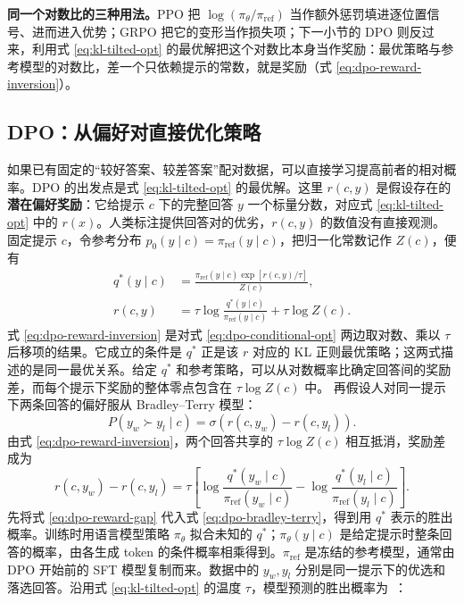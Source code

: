 \textbf{同一个对数比的三种用法。}PPO 把 \(\log(\pi_\theta/\pi_{\mathrm{ref}})\) 当作额外惩罚填进逐位置信号、进而进入优势；GRPO 把它的变形当作损失项；下一小节的 DPO 则反过来，利用式 \eqref{eq:kl-tilted-opt} 的最优解把这个对数比本身当作奖励：最优策略与参考模型的对数比，差一个只依赖提示的常数，就是奖励（式 \eqref{eq:dpo-reward-inversion}）。

\subsection{DPO：从偏好对直接优化策略}

如果已有固定的“较好答案、较差答案”配对数据，可以直接学习提高前者的相对概率。DPO 的出发点是式 \eqref{eq:kl-tilted-opt} 的最优解。这里 \(r(c,y)\) 是假设存在的\textbf{潜在偏好奖励}：它给提示 \(c\) 下的完整回答 \(y\) 一个标量分数，对应式 \eqref{eq:kl-tilted-opt} 中的 \(r(x)\)。人类标注提供回答对的优劣，\(r(c,y)\) 的数值没有直接观测。固定提示 \(c\)，令参考分布 \(p_0(y\mid c)=\pi_{\mathrm{ref}}(y\mid c)\)，把归一化常数记作 \(Z(c)\)，便有
\begin{align}
 q^*(y\mid c)&=\frac{\pi_{\mathrm{ref}}(y\mid c)\exp[r(c,y)/\tau]}{Z(c)},\label{eq:dpo-conditional-opt}\\
 r(c,y)&=\tau\log\frac{q^*(y\mid c)}{\pi_{\mathrm{ref}}(y\mid c)}+\tau\log Z(c).\label{eq:dpo-reward-inversion}
\end{align}
式 \eqref{eq:dpo-reward-inversion} 是对式 \eqref{eq:dpo-conditional-opt} 两边取对数、乘以 \(\tau\) 后移项的结果。它成立的条件是 \(q^*\) 正是该 \(r\) 对应的 KL 正则最优策略；这两式描述的是同一最优关系。给定 \(q^*\) 和参考策略，可以从对数概率比确定回答间的奖励差，而每个提示下奖励的整体零点包含在 \(\tau\log Z(c)\) 中。
再假设人对同一提示下两条回答的偏好服从 Bradley--Terry 模型：
\begin{equation}
 P(y_w\succ y_l\mid c)=\sigma\!\left(r(c,y_w)-r(c,y_l)\right).\label{eq:dpo-bradley-terry}
\end{equation}
由式 \eqref{eq:dpo-reward-inversion}，两个回答共享的 \(\tau\log Z(c)\) 相互抵消，奖励差成为
\begin{equation}
 r(c,y_w)-r(c,y_l)=\tau\left[
 \log\frac{q^*(y_w\mid c)}{\pi_{\mathrm{ref}}(y_w\mid c)}
 -\log\frac{q^*(y_l\mid c)}{\pi_{\mathrm{ref}}(y_l\mid c)}\right].\label{eq:dpo-reward-gap}
\end{equation}
先将式 \eqref{eq:dpo-reward-gap} 代入式 \eqref{eq:dpo-bradley-terry}，得到用 \(q^*\) 表示的胜出概率。训练时用语言模型策略 \(\pi_\theta\) 拟合未知的 \(q^*\)；\(\pi_\theta(y\mid c)\) 是给定提示时整条回答的概率，由各生成 token 的条件概率相乘得到。\(\pi_{\mathrm{ref}}\) 是冻结的参考模型，通常由 DPO 开始前的 SFT 模型复制而来。数据中的 \(y_w,y_l\) 分别是同一提示下的优选和落选回答。沿用式 \eqref{eq:kl-tilted-opt} 的温度 \(\tau\)，模型预测的胜出概率为~\cite{rafailov2023dpo}：
